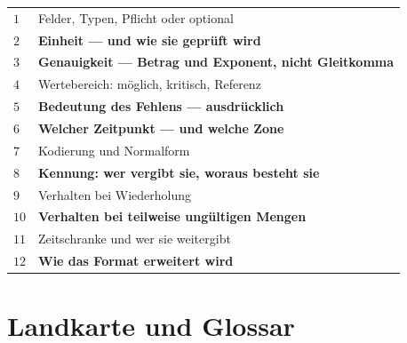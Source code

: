 \begin{merksatz}
\begin{center}
{\small
\renewcommand{\arraystretch}{1.45}
\begin{tabular}{@{}P{1.0cm}P{7.6cm}@{}}
\toprule
$1$ & Felder, Typen, Pflicht oder optional\\
$2$ & \textbf{Einheit --- und wie sie geprüft wird}\\
$3$ & \textbf{Genauigkeit --- Betrag und Exponent, nicht Gleitkomma}\\
$4$ & Wertebereich: möglich, kritisch, Referenz\\
$5$ & \textbf{Bedeutung des Fehlens --- ausdrücklich}\\
$6$ & \textbf{Welcher Zeitpunkt --- und welche Zone}\\
$7$ & Kodierung und Normalform\\
$8$ & \textbf{Kennung: wer vergibt sie, woraus besteht sie}\\
$9$ & Verhalten bei Wiederholung\\
$10$ & \textbf{Verhalten bei teilweise ungültigen Mengen}\\
$11$ & Zeitschranke und wer sie weitergibt\\
$12$ & \textbf{Wie das Format erweitert wird}\\
\bottomrule
\end{tabular}}
\end{center}

\begin{center}
\end{center}
\end{merksatz}

\chapter{Landkarte und Glossar}

